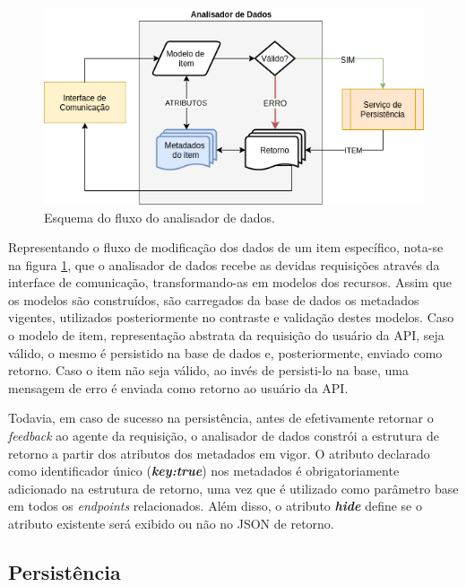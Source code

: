 \documentclass[12pt, openright, oneside, a4paper, brazil]{abntex2}
\begin{document}
\begin{figure}[h!tp]
	\caption{\label{validation_schema}Esquema do fluxo do analisador de dados.}
	\begin{center}
		\includegraphics[scale=0.8]{images/validation.png}
	\end{center}
	\hspace{5.5cm}{Fonte: O Autor.}
\end{figure}

Representando o fluxo de modificação dos dados de um item específico, nota-se na figura \ref{validation_schema}, que o analisador de dados recebe as devidas requisições através da interface de comunicação, transformando-as em modelos dos recursos. Assim que os modelos são construídos, são carregados da base de dados os metadados vigentes, utilizados posteriormente no contraste e validação destes modelos. Caso o modelo de item, representação abstrata da requisição do usuário da API, seja válido, o mesmo é persistido na base de dados e, posteriormente, enviado como retorno. Caso o item não seja válido, ao invés de persisti-lo na base, uma mensagem de erro é enviada como retorno ao usuário da API.

Todavia, em caso de sucesso na persistência, antes de efetivamente retornar o \textit{feedback} ao agente da requisição, o analisador de dados constrói a estrutura de retorno a partir dos atributos dos metadados em vigor. O atributo declarado como identificador único (\textbf{\textit{key:true}}) nos metadados é obrigatoriamente adicionado na estrutura de retorno, uma vez que é utilizado como parâmetro base em todos os \textit{endpoints} relacionados. Além disso, o atributo \textbf{\textit{hide}} define se o atributo existente será exibido ou não no JSON de retorno.

\subsection{Persistência} \label{analisador:persistencia}
\end{document}
